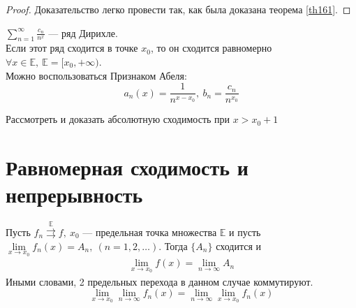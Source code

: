 \begin{proof}
  Доказательство легко провести так, как была доказана теорема \ref{th161}.
\end{proof}

\begin{example}
  $\sum\limits_{n = 1}^{\infty} \frac{c_n}{n^x}$ ---
  ряд Дирихле. \\
  Если этот ряд сходится в точке $x_0$, то он сходится равномерно
  $\forall x \in \mathbb{E}, \ \mathbb{E} = [x_0, +\infty)$. \\
  Можно воспользоваться Признаком Абеля:
  $$a_n(x) = \frac{1}{n^{x-x_0}}, \ b_n = \frac{c_n}{n^{x_0}}$$
\end{example}

\begin{exercise}
  Рассмотреть и доказать абсолютную сходимость при $x > x_0 + 1$
\end{exercise}

\section{Равномерная сходимость и непрерывность}

\begin{theorem}
  Пусть $f_n \stackrel{\mathrm{\mathbb{E}}}{\rightrightarrows} f, \ x_0$ ---
  предельная точка множества $\mathbb{E}$ и пусть
  $\lim\limits_{x \to x_0} f_n(x) = A_n, \ (n = 1, 2, \dots).$
  Тогда $\{A_n\}$ сходится и
  \begin{gather}
    \lim\limits_{x \to x_0} f(x) = \lim\limits_{n \to \infty} A_n \label{th241:lim1}
  \end{gather}
  Иными словами, 2 предельных перехода в данном случае коммутируют. \\
  $$\lim\limits_{x \to x_0} \lim\limits_{n \to \infty} f_n(x) =
  \lim\limits_{n \to \infty} \lim\limits_{x \to x_0} f_n(x)$$
\end{theorem}

